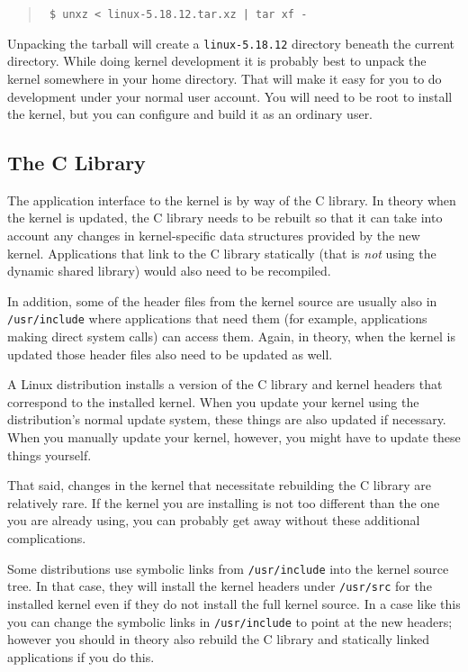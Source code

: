 \documentclass{article}
\newcommand{\filename}[1]{\texttt{#1}}
\newenvironment{commands}
  {\begin{quote} \tt}
  {\end{quote}}
\begin{document}
\begin{commands}
  \$ unxz < linux-5.18.12.tar.xz | tar xf -
\end{commands}

Unpacking the tarball will create a \filename{linux-5.18.12} directory beneath the current
directory. While doing kernel development it is probably best to unpack the kernel somewhere in
your home directory. That will make it easy for you to do development under your normal user
account. You will need to be root to install the kernel, but you can configure and build it as
an ordinary user.

\subsection{The C Library }

The application interface to the kernel is by way of the C library. In theory when the kernel is
updated, the C library needs to be rebuilt so that it can take into account any changes in
kernel-specific data structures provided by the new kernel. Applications that link to the C
library statically (that is \emph{not} using the dynamic shared library) would also need to be
recompiled.

In addition, some of the header files from the kernel source are usually also in
\filename{/usr/include} where applications that need them (for example, applications making
direct system calls) can access them. Again, in theory, when the kernel is updated those header
files also need to be updated as well.

A Linux distribution installs a version of the C library and kernel headers that correspond to
the installed kernel. When you update your kernel using the distribution's normal update system,
these things are also updated if necessary. When you manually update your kernel, however, you
might have to update these things yourself.

That said, changes in the kernel that necessitate rebuilding the C library are relatively rare.
If the kernel you are installing is not too different than the one you are already using, you
can probably get away without these additional complications.

Some distributions use symbolic links from \filename{/usr/include} into the kernel source tree.
In that case, they will install the kernel headers under \filename{/usr/src} for the installed
kernel even if they do not install the full kernel source. In a case like this you can change
the symbolic links in \filename{/usr/include} to point at the new headers; however you should in
theory also rebuild the C library and statically linked applications if you do this.
\end{document}
